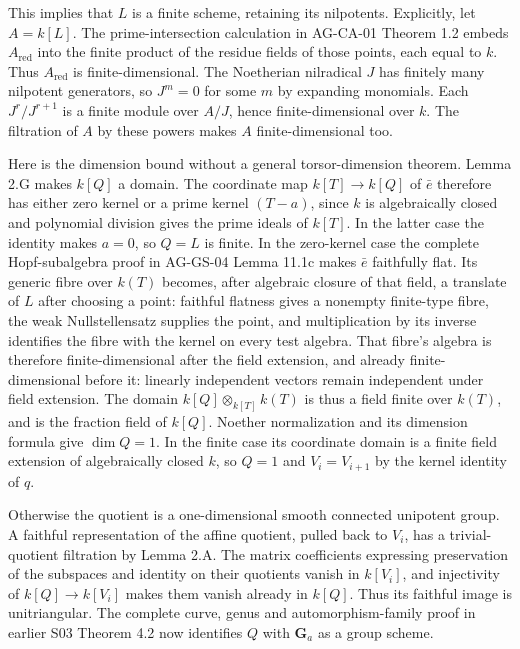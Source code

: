 \documentclass[11pt,a4paper,openany]{report}
\newcounter{none}
\begin{document}
This implies that \(L\) is a finite scheme, retaining its nilpotents. Explicitly, let \(A=k[L]\). The prime-intersection calculation in AG-CA-01 Theorem 1.2 embeds \(A_{\mathrm{red}}\) into the finite product of the residue fields of those points, each equal to \(k\). Thus \(A_{\mathrm{red}}\) is finite-dimensional. The Noetherian nilradical \(J\) has finitely many nilpotent generators, so \(J^m=0\) for some \(m\) by expanding monomials. Each \(J^r/J^{r+1}\) is a finite module over \(A/J\), hence finite-dimensional over \(k\). The filtration of \(A\) by these powers makes \(A\) finite-dimensional too.

Here is the dimension bound without a general torsor-dimension theorem. Lemma 2.G makes \(k[Q]\) a domain. The coordinate map \(k[T]\to k[Q]\) of \(\bar e\) therefore has either zero kernel or a prime kernel \((T-a)\), since \(k\) is algebraically closed and polynomial division gives the prime ideals of \(k[T]\). In the latter case the identity makes \(a=0\), so \(Q=L\) is finite. In the zero-kernel case the complete Hopf-subalgebra proof in AG-GS-04 Lemma 11.1c makes \(\bar e\) faithfully flat. Its generic fibre over \(k(T)\) becomes, after algebraic closure of that field, a translate of \(L\) after choosing a point: faithful flatness gives a nonempty finite-type fibre, the weak Nullstellensatz supplies the point, and multiplication by its inverse identifies the fibre with the kernel on every test algebra. That fibre's algebra is therefore finite-dimensional after the field extension, and already finite-dimensional before it: linearly independent vectors remain independent under field extension. The domain \(k[Q]\otimes_{k[T]}k(T)\) is thus a field finite over \(k(T)\), and is the fraction field of \(k[Q]\). Noether normalization and its dimension formula give \(\dim Q=1\). In the finite case its coordinate domain is a finite field extension of algebraically closed \(k\), so \(Q=1\) and \(V_i=V_{i+1}\) by the kernel identity of \(q\).

Otherwise the quotient is a one-dimensional smooth connected unipotent group. A faithful representation of the affine quotient, pulled back to \(V_i\), has a trivial-quotient filtration by Lemma 2.A. The matrix coefficients expressing preservation of the subspaces and identity on their quotients vanish in \(k[V_i]\), and injectivity of \(k[Q]\to k[V_i]\) makes them vanish already in \(k[Q]\). Thus its faithful image is unitriangular. The complete curve, genus and automorphism-family proof in earlier S03 Theorem 4.2 now identifies \(Q\) with \(\mathbf G_a\) as a group scheme.
\end{document}
